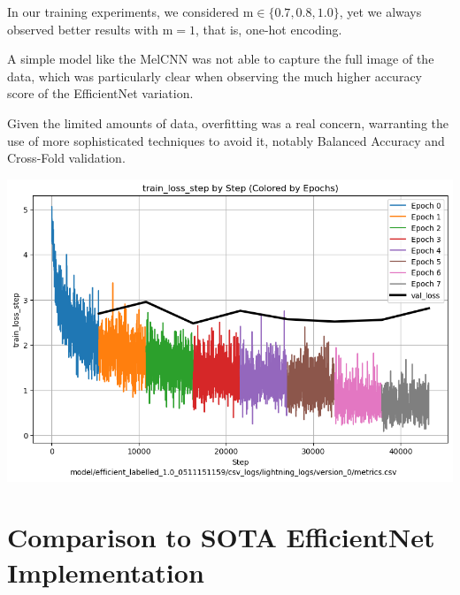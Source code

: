 \documentclass[10pt]{article}
\begin{document}
\begin{minipage}{0.48\linewidth}

In our training experiments, we considered $\text{m} \in \{0.7, 0.8, 1.0\}$, yet we always observed better results with $\text{m} = 1$, that is, one-hot encoding.

A simple model like the MelCNN was not able to capture the full image of the data, which was particularly clear when observing the much higher accuracy score of the EfficientNet variation.

Given the limited amounts of data, overfitting was a real concern, warranting the use of more sophisticated techniques to avoid it, notably Balanced Accuracy and Cross-Fold validation.
\end{minipage}
\hfill
\begin{minipage}{0.48\linewidth}
  \includegraphics[width=\linewidth]{img/efficient_loss_accuracy_plot.png}
\end{minipage}


\section*{Comparison to SOTA EfficientNet Implementation}
\end{document}
